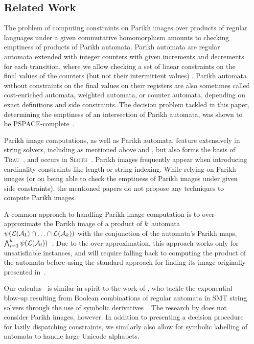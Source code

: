 \subsection{Related Work}

The problem of computing constraints on Parikh images over products of regular
languages under a given commutative homomorphism amounts to checking emptiness
of products of
Parikh automata. Parikh automata are regular automata extended with integer
counters with given increments and decrements for each transition, where we
allow checking a set of linear constraints on the final values of the counters
(but not their intermittent values) \cite{parikh-automata}. Parikh automata
without constraints on the final values on their registers are also sometimes
called cost-enriched automata, weighted automata, or counter automata, depending
on exact definitions and side constraints. The decision problem tackled in this
paper, determining the emptiness of an intersection of Parikh automata, was
shown to be PSPACE-complete~\cite{graph-queries}.

Parikh image computations, as well as Parikh automata, feature extensively in
string solvers, including as mentioned above \Ostrich{} and \OstrichPlus{}
\cite{ostrich,ostrich-plus}, but also forms the basis of
\textsc{Trau}~\cite{trau-pldi},
and occurs in \textsc{Sloth}~\cite{sloth}. Parikh images frequently appear when
introducing cardinality constraints like length or string indexing.
While relying on Parikh images (or on being able to check
the emptiness of Parikh images under given side constraints), the mentioned
papers do not propose any techniques to compute Parikh images.


A common approach to handling Parikh image computation is to
over-approximate the Parikh image of a product of $k$~automata
$\operatorname{\psi}(\operatorname{\mathcal{L}}(\mathcal{A}_1) \cap \ldots \cap \operatorname{\mathcal{L}}(\mathcal{A}_k))$
with the conjunction of the automata's Parikh maps, $\bigwedge_{i=1}^{k}
\operatorname{\psi}(\operatorname{\mathcal{L}}(\mathcal{A}_i))$~\cite{approximate-parikh}.
Due to the over-approximation,
this approach works only for unsatisfiable instances,
and will require falling back to computing the product of the automata before
using the standard approach for finding its image originally presented
in~\cite{generate-parikh-image}.

Our calculus~\Calculus{} is similar in spirit to the work
of \citeauthor{symbolic-boolean-derivatives}, who tackle the exponential
blow-up resulting from Boolean combinations
of regular automata in SMT string solvers
through the use of symbolic derivatives~\cite{symbolic-boolean-derivatives}.
 The research by
 \citeauthor{symbolic-boolean-derivatives} does not consider Parikh images,
 however. In addition to presenting a decision procedure for lazily dispatching
constraints, we similarly also allow for symbolic labelling of automata to
handle large Unicode alphabets.

